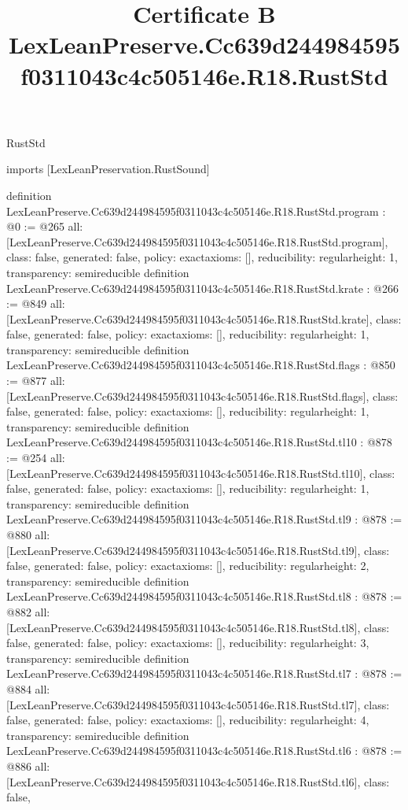 \begin{lexlean}{RustStd}
\title{Certificate B LexLeanPreserve.Cc639d244984595f0311043c4c505146e.R18.RustStd}
\begin{coremodule}
imports [LexLeanPreservation.RustSound]

definition LexLeanPreserve.Cc639d244984595f0311043c4c505146e.R18.RustStd.program : @0 := @265 {
  all: [LexLeanPreserve.Cc639d244984595f0311043c4c505146e.R18.RustStd.program],
  class: false,
  generated: false,
  policy: exact{axioms: []},
  reducibility: regular{height: 1},
  transparency: semireducible
}
definition LexLeanPreserve.Cc639d244984595f0311043c4c505146e.R18.RustStd.krate : @266 := @849 {
  all: [LexLeanPreserve.Cc639d244984595f0311043c4c505146e.R18.RustStd.krate],
  class: false,
  generated: false,
  policy: exact{axioms: []},
  reducibility: regular{height: 1},
  transparency: semireducible
}
definition LexLeanPreserve.Cc639d244984595f0311043c4c505146e.R18.RustStd.flags : @850 := @877 {
  all: [LexLeanPreserve.Cc639d244984595f0311043c4c505146e.R18.RustStd.flags],
  class: false,
  generated: false,
  policy: exact{axioms: []},
  reducibility: regular{height: 1},
  transparency: semireducible
}
definition LexLeanPreserve.Cc639d244984595f0311043c4c505146e.R18.RustStd.tl10 : @878 := @254 {
  all: [LexLeanPreserve.Cc639d244984595f0311043c4c505146e.R18.RustStd.tl10],
  class: false,
  generated: false,
  policy: exact{axioms: []},
  reducibility: regular{height: 1},
  transparency: semireducible
}
definition LexLeanPreserve.Cc639d244984595f0311043c4c505146e.R18.RustStd.tl9 : @878 := @880 {
  all: [LexLeanPreserve.Cc639d244984595f0311043c4c505146e.R18.RustStd.tl9],
  class: false,
  generated: false,
  policy: exact{axioms: []},
  reducibility: regular{height: 2},
  transparency: semireducible
}
definition LexLeanPreserve.Cc639d244984595f0311043c4c505146e.R18.RustStd.tl8 : @878 := @882 {
  all: [LexLeanPreserve.Cc639d244984595f0311043c4c505146e.R18.RustStd.tl8],
  class: false,
  generated: false,
  policy: exact{axioms: []},
  reducibility: regular{height: 3},
  transparency: semireducible
}
definition LexLeanPreserve.Cc639d244984595f0311043c4c505146e.R18.RustStd.tl7 : @878 := @884 {
  all: [LexLeanPreserve.Cc639d244984595f0311043c4c505146e.R18.RustStd.tl7],
  class: false,
  generated: false,
  policy: exact{axioms: []},
  reducibility: regular{height: 4},
  transparency: semireducible
}
definition LexLeanPreserve.Cc639d244984595f0311043c4c505146e.R18.RustStd.tl6 : @878 := @886 {
  all: [LexLeanPreserve.Cc639d244984595f0311043c4c505146e.R18.RustStd.tl6],
  class: false,
}
\end{coremodule}
\end{lexlean}
